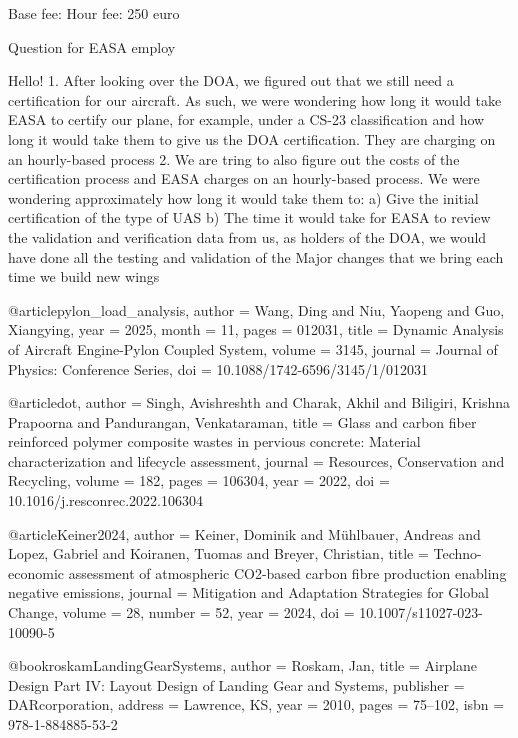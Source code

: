 Base fee: 
Hour fee: 250 euro


Question for EASA employ

Hello!
1. After looking over the DOA, we figured out that we still need a certification for our aircraft. As such, we were wondering how long it would take EASA to certify our plane, for example, under a CS-23 classification and how long it would take them to give us the DOA certification. They are charging on an hourly-based process
2. We are tring to also figure out the costs of the certification process and EASA charges on an hourly-based process. We were wondering approximately how long it would take them to: 
    a) Give the initial certification of the type of UAS
    b) The time it would take for EASA to review the validation and verification data from us, as holders of the DOA, we would have done all the testing and validation of the Major changes that we bring each time we build new wings  



    @article{pylon_load_analysis,
author = {Wang, Ding and Niu, Yaopeng and Guo, Xiangying},
year = {2025},
month = {11},
pages = {012031},
title = {Dynamic Analysis of Aircraft Engine-Pylon Coupled System},
volume = {3145},
journal = {Journal of Physics: Conference Series},
doi = {10.1088/1742-6596/3145/1/012031}
}

@article{dot,
  author  = {Singh, Avishreshth and Charak, Akhil and Biligiri, Krishna Prapoorna and Pandurangan, Venkataraman},
  title   = {Glass and carbon fiber reinforced polymer composite wastes in pervious concrete: Material characterization and lifecycle assessment},
  journal = {Resources, Conservation and Recycling},
  volume  = {182},
  pages   = {106304},
  year    = {2022},
  doi     = {10.1016/j.resconrec.2022.106304}
}

@article{Keiner2024,
  author  = {Keiner, Dominik and M{\"u}hlbauer, Andreas and Lopez, Gabriel and Koiranen, Tuomas and Breyer, Christian},
  title   = {Techno-economic assessment of atmospheric {CO2}-based carbon fibre production enabling negative emissions},
  journal = {Mitigation and Adaptation Strategies for Global Change},
  volume  = {28},
  number  = {52},
  year    = {2024},
  doi     = {10.1007/s11027-023-10090-5}
}

@book{roskamLandingGearSystems,
  author    = {Roskam, Jan},
  title     = {Airplane Design Part IV: Layout Design of Landing Gear and Systems},
  publisher = {DARcorporation},
  address   = {Lawrence, KS},
  year      = {2010},
  pages     = {75--102},
  isbn      = {978-1-884885-53-2}
}

